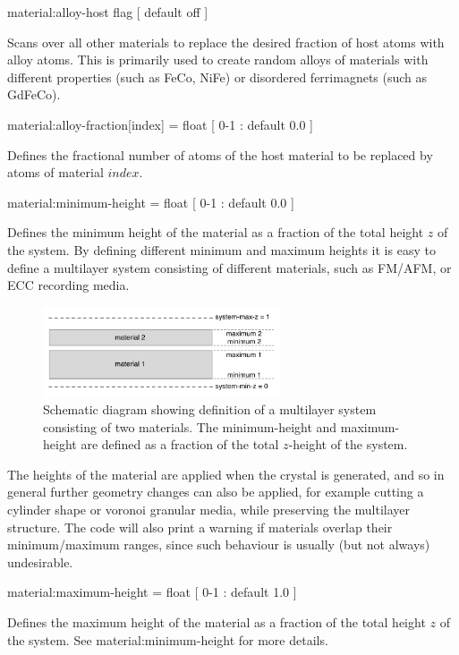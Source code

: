 {\zicf material:alloy-host flag [ default off ]} Scans over all other materials to replace the desired fraction of host atoms with alloy atoms. This is primarily used to create random alloys of materials with different properties (such as FeCo, NiFe) or disordered ferrimagnets (such as GdFeCo).


{\zicf material:alloy-fraction[index] = float [ 0-1 : default 0.0 ]} Defines the fractional number of atoms of the host material to be replaced by atoms of material $index$.

{\zicf material:minimum-height = float [ 0-1 : default 0.0 ]} Defines the minimum height of the material as a fraction of the total height $z$ of the system. By defining different minimum and maximum heights it is easy to define a multilayer system consisting of different materials, such as FM/AFM, or ECC recording media.

\begin{figure}[!h]
\center
\includegraphics[width=7cm]{figures/multilayers.pdf}
\caption{Schematic diagram showing definition of a multilayer system consisting of two materials. The minimum-height and maximum-height are defined as a fraction of the total $z$-height of the system.}
\label{fig:multilayer}
\end{figure}

The heights of the material are applied when the crystal is generated, and so in general further geometry changes can also be applied, for example cutting a cylinder shape or voronoi granular media, while preserving the multilayer structure. The code will also print a warning if materials overlap their minimum/maximum ranges, since such behaviour is usually (but not always) undesirable.

{\zicf material:maximum-height = float [ 0-1 : default 1.0 ]} Defines the maximum height of the material as a fraction of the total height $z$ of the system. See material:minimum-height for more details.

